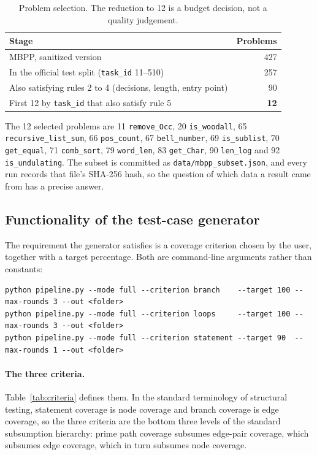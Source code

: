 \documentclass[11pt,a4paper]{article}
\begin{document}
\begin{table}[htbp]
\centering
\small
\caption{Problem selection. The reduction to 12 is a budget decision, not a quality judgement.}
\label{tab:funnel}
\begin{tabular}{@{}lr@{}}
\toprule
\textbf{Stage} & \textbf{Problems} \\
\midrule
MBPP, sanitized version & 427 \\
In the official test split (\texttt{task\_id} 11--510) & 257 \\
Also satisfying rules 2 to 4 (decisions, length, entry point) & 90 \\
First 12 by \texttt{task\_id} that also satisfy rule 5 & \textbf{12} \\
\bottomrule
\end{tabular}
\end{table}

The 12 selected problems are 11 \texttt{remove\_Occ}, 20 \texttt{is\_woodall}, 65
\texttt{recursive\_list\_sum}, 66 \texttt{pos\_count}, 67 \texttt{bell\_number}, 69 \texttt{is\_sublist}, 70
\texttt{get\_equal}, 71 \texttt{comb\_sort}, 79 \texttt{word\_len}, 83 \texttt{get\_Char}, 90
\texttt{len\_log} and 92 \texttt{is\_undulating}. The subset is committed as \texttt{data/mbpp\_subset.json}, and every run records
that file's SHA-256 hash, so the question of which data a result came from has a precise answer.

\subsection{Functionality of the test-case generator}

The requirement the generator satisfies is a coverage criterion chosen by the user, together with a target
percentage. Both are command-line arguments rather than constants:

\begin{lstlisting}[style=plain]
python pipeline.py --mode full --criterion branch    --target 100 --max-rounds 3 --out <folder>
python pipeline.py --mode full --criterion loops     --target 100 --max-rounds 3 --out <folder>
python pipeline.py --mode full --criterion statement --target 90  --max-rounds 1 --out <folder>
\end{lstlisting}

\paragraph{The three criteria.} Table~\ref{tab:criteria} defines them. In the standard terminology of
structural testing, statement coverage is node coverage and branch coverage is edge coverage, so the three
criteria are the bottom three levels of the standard subsumption hierarchy: prime path coverage subsumes
edge-pair coverage, which subsumes edge coverage, which in turn subsumes node coverage.
\end{document}

